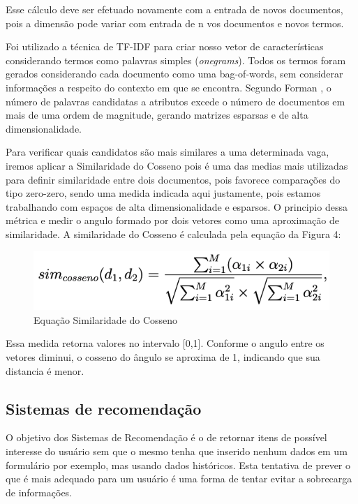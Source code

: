 \documentclass[conference]{IEEEtran}
\begin{document}
  Esse cálculo deve ser efetuado novamente com a entrada de novos documentos, pois a dimensão pode variar com entrada de n vos documentos e novos termos.
  
  
Foi utilizado a técnica de TF-IDF para criar nosso vetor de características considerando termos como palavras simples (\textit{onegrams}). Todos os termos foram gerados considerando cada documento como uma bag-of-words, sem considerar informações a respeito do contexto em que se encontra. Segundo Forman \cite{bagofwords}, o número de palavras candidatas a atributos excede o número de documentos em mais de uma ordem de magnitude, gerando matrizes esparsas e de alta dimensionalidade.
 
Para verificar quais candidatos são mais similares a uma determinada vaga, iremos aplicar a Similaridade do Cosseno pois é uma das medias mais utilizadas para definir similaridade entre dois documentos, pois favorece comparações do tipo zero-zero, sendo uma medida indicada aqui justamente,  pois estamos trabalhando com espaços de alta dimensionalidade e esparsos. O principio dessa métrica e medir o angulo formado por dois vetores como uma aproximação de similaridade. A similaridade do Cosseno é calculada pela equação da Figura 4:

	\begin{figure}[htbp]
	\centerline{\includegraphics[scale=.4]{imagens/cosseno.png}}
	\caption{Equação Similaridade do Cosseno}
	\label{fig}
	\end{figure}

Essa medida retorna valores no intervalo [0,1]. Conforme o angulo entre os vetores diminui, o cosseno do ângulo se aproxima de 1, indicando que sua distancia é menor.

	\subsection{Sistemas de recomendação}
    	
 O objetivo dos Sistemas de Recomendação é o de retornar itens de possível interesse do usuário sem que o mesmo tenha que inserido nenhum dados em um formulário por exemplo, mas usando dados históricos. Esta tentativa de prever o que é mais adequado para um usuário é uma forma de tentar evitar a sobrecarga de informações.
    
\end{document}
